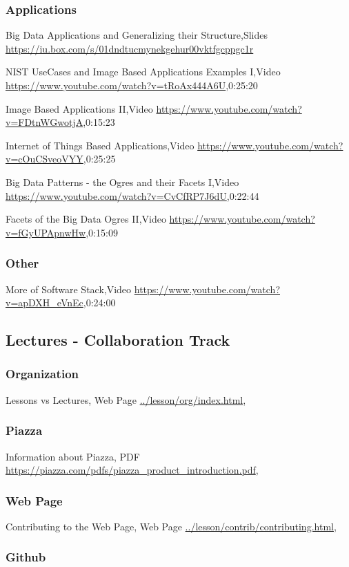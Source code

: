 \subsubsection{Applications}

Big Data Applications and Generalizing their Structure,Slides \url{https://iu.box.com/s/01dndtucmynekgehur00vktfgcppgc1r}

NIST UseCases and Image Based Applications Examples I,Video \url{https://www.youtube.com/watch?v=tRoAx444A6U},0:25:20

Image Based Applications II,Video \url{https://www.youtube.com/watch?v=FDtnWGwotjA},0:15:23

Internet of Things Based Applications,Video \url{https://www.youtube.com/watch?v=cOuCSveoVYY},0:25:25

Big Data Patterns - the Ogres and their Facets I,Video \url{https://www.youtube.com/watch?v=CvCfRP7J6dU},0:22:44

Facets of the Big Data Ogres II,Video \url{https://www.youtube.com/watch?v=fGyUPApnwHw},0:15:09

\subsubsection{Other}

More of Software Stack,Video \url{https://www.youtube.com/watch?v=apDXH_eVnEc},0:24:00

\subsection{Lectures - Collaboration Track}\label{lectures---collaboration-track}


\subsubsection{Organization}
 Lessons vs Lectures, Web Page \url{../lesson/org/index.html},
\subsubsection{Piazza}
 Information about Piazza, PDF \url{https://piazza.com/pdfs/piazza_product_introduction.pdf},
\subsubsection{Web Page}
 Contributing to the Web Page, Web Page \url{../lesson/contrib/contributing.html},


\subsubsection{Github}
 
